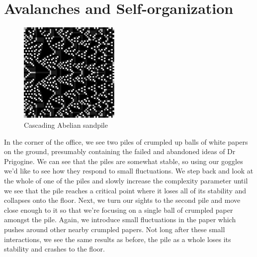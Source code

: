 \documentclass{article}
\begin{document}

\section{Avalanches and Self-organization}

\begin{figure}
  \begin{center}
    \includegraphics[width=0.43\textwidth]{abelian_sandpile.png}
    \caption{Cascading Abelian sandpile}
  \end{center}
\end{figure}

In the corner of the office, we see two piles of crumpled up balls of white papers on the ground, presumably containing the failed and abandoned ideas of Dr Prigogine. We can see that the piles are somewhat stable, so using our goggles we'd like to see how they respond to small fluctuations. We step back and look at the whole of one of the piles and slowly increase the complexity parameter until we see that the pile reaches a critical point where it loses all of its stability and collapses onto the floor. Next, we turn our sights to the second pile and move close enough to it so that we're focusing on a single ball of crumpled paper amongst the pile. Again, we introduce small fluctuations in the paper which pushes around other nearby crumpled papers. Not long after these small interactions, we see the same results as before, the pile as a whole loses its stability and crashes to the floor.
\end{document}
